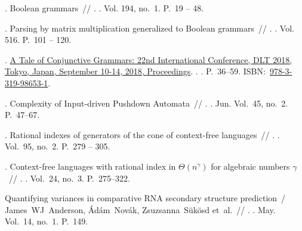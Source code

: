 \begin{thebibliography}{10}
. Boolean grammars~//
  \href{http://dx.doi.org/10.1016/j.ic.2004.03.006}{}. \BibDash
{}. \BibDash
\newblock Vol. 194, no.~1. \BibDash
\newblock P.~19 -- 48.

. Parsing by matrix multiplication generalized to
  Boolean grammars~//
  \href{http://dx.doi.org/10.1016/j.tcs.2013.09.011}{}. \BibDash
{}. \BibDash
\newblock Vol. 516. \BibDash
\newblock P.~101 -- 120.

.
  \href{http://dx.doi.org/10.1007/978-3-319-98654-8_4}{A Tale of Conjunctive
  Grammars: 22nd International Conference, DLT 2018, Tokyo, Japan, September
  10-14, 2018, Proceedings}. \BibDash
{}. . \BibDash
\newblock P.~36--59. \BibDash
\newblock
  ISBN:~\href{http://isbndb.com/search-all.html?kw=978-3-319-98653-1}{978-3-319-98653-1}.

. Complexity of Input-driven Pushdown
  Automata~// \href{http://dx.doi.org/10.1145/2636805.2636821}{}. \BibDash
{}. \BibDash Jun. \BibDash
\newblock Vol.~45, no.~2. \BibDash
\newblock P.~47--67.

. Rational indexes of generators of the cone of
  context-free languages~//
  \href{http://dx.doi.org/10.1016/0304-3975(92)90269-L}{}. \BibDash
{}. \BibDash
\newblock Vol.~95, no.~2. \BibDash
\newblock P.~279 -- 305.

. Context-free languages with
  rational index in $\Theta (n^\gamma )$ for algebraic numbers $\gamma $~//
  . \BibDash
{}. \BibDash
\newblock Vol.~24, no.~3. \BibDash
\newblock P.~275--322.

Quantifying variances in comparative RNA secondary structure prediction~/
  James~WJ~Anderson, {\'A}d{\'a}m~Nov{\'a}k, Zsuzsanna~S{\"u}k{\"o}sd et~al.~//
  \href{http://dx.doi.org/10.1186/1471-2105-14-149}{}. \BibDash
{}. \BibDash May. \BibDash
\newblock Vol.~14, no.~1. \BibDash
\newblock P.~149.


\end{thebibliography}
